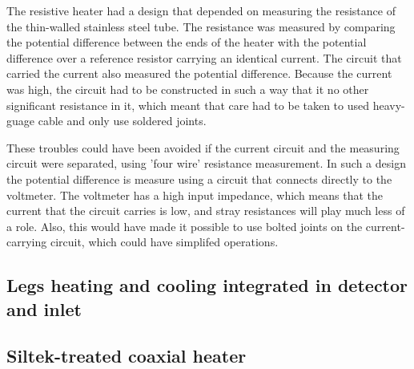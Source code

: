 The resistive heater had a design that depended on measuring the resistance of
the thin-walled stainless steel tube. The resistance was measured by comparing
the potential difference between the ends of the heater with the potential
difference over a reference resistor carrying an identical current. The circuit
that carried the current also measured the potential difference. Because the
current was high, the circuit had to be constructed in such a way that it no
other significant resistance in it, which meant that care had to be taken to
used heavy-guage cable and only use soldered joints. 

These troubles could have been avoided if the current circuit and the measuring
circuit were separated, using 'four wire' resistance measurement. In such a
design the potential difference is measure using a circuit that connects
directly to the voltmeter. The voltmeter has a high input impedance, which means
that the current that the circuit carries is low, and stray resistances will
play much less of a role. Also, this would have made it possible to use bolted
joints on the current-carrying circuit, which could have simplifed operations.

\subsection{Legs heating and cooling integrated in detector and inlet}


\subsection{Siltek-treated coaxial heater}



\todos
